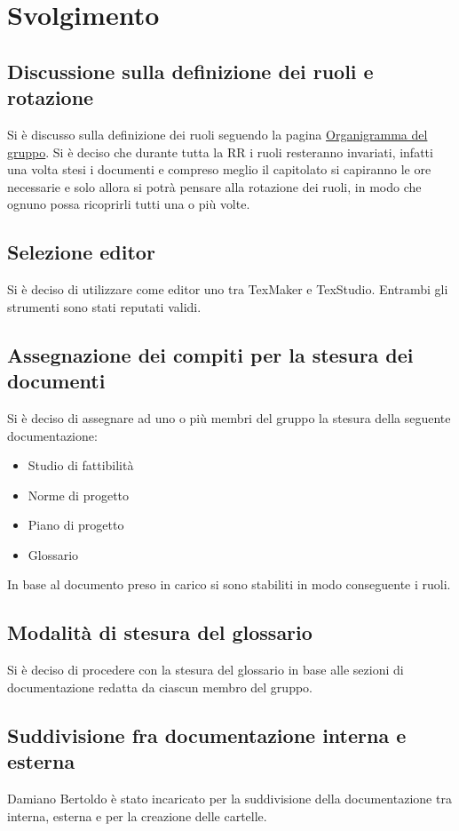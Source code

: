 \section*{Svolgimento}
\subsection*{Discussione sulla definizione dei ruoli e rotazione}
			Si è discusso sulla definizione dei ruoli seguendo la pagina
			\href{https://www.math.unipd.it/~tullio/IS-1/2020/Progetto/RO.html#Org}{Organigramma del gruppo}.
			Si è deciso che durante tutta la RR i ruoli resteranno invariati, infatti
			una volta stesi i documenti e compreso meglio il capitolato si capiranno le ore necessarie e solo allora si potrà pensare alla rotazione dei ruoli, in modo che ognuno possa ricoprirli tutti una o più volte. 

\subsection*{Selezione editor \glock{\LaTeX}}
			Si è deciso di utilizzare come editor \glock{\LaTeX} uno tra TexMaker e TexStudio.
			Entrambi gli strumenti sono stati reputati validi.
			


\subsection*{\hypertarget{thesentence}{Assegnazione dei compiti per la stesura dei documenti}}
			Si è deciso di assegnare ad uno o più membri del gruppo la stesura della seguente documentazione:
			\begin{itemize}
			\item Studio di fattibilità
			\item Norme di progetto
			\item Piano di progetto
			\item Glossario
			\end{itemize}
			In base al documento preso in carico si sono stabiliti in modo conseguente i ruoli.

\subsection*{Modalità di stesura del glossario}
		    Si è deciso di procedere con la stesura del glossario in base alle sezioni di documentazione redatta da ciascun membro del gruppo.

\subsection*{Suddivisione fra documentazione interna e esterna}
			Damiano Bertoldo è stato incaricato per la suddivisione della documentazione tra interna, esterna e per la creazione delle cartelle. 


